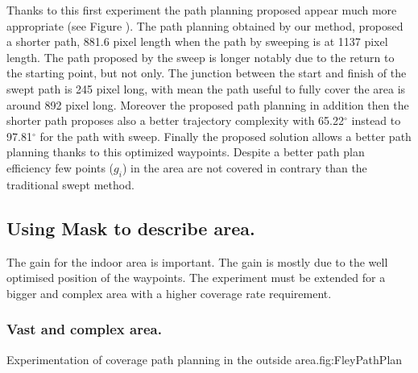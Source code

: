 Thanks to this first experiment the path planning proposed appear much more appropriate (see Figure ). The path planning obtained by our method, proposed a shorter path, 881.6 pixel length when  the path by sweeping is at 1137 pixel length. The path proposed by the sweep is longer notably due to the return to the starting point, but not only. The junction between the start and finish of the swept path is 245 pixel long, with mean the path useful to fully cover the area is around 892 pixel long. Moreover the proposed path planning in addition then the shorter path proposes also a better trajectory complexity  with 65.22$^\circ$ instead to 97.81$^\circ$ for the path with sweep.
Finally the proposed solution allows a better path planning thanks to this optimized waypoints. Despite a better path plan efficiency few points ($g_i$) in the area are not covered in contrary than the traditional swept method.



\subsection{Using Mask to describe area.}\label{coverageOutDoor}

The gain for the indoor area is important. The gain is mostly due to the well optimised position of the waypoints. The experiment must be extended for a bigger and complex area with a higher coverage rate requirement.


\subsubsection{Vast and complex area.} \label{fey_map_CPPP}
 
 \begin{mfigures}[!]{Experimentation of coverage path planning in the outside area.}{fig:FleyPathPlan} \centering
\hspace{1cm}

\tabsimuposeFleyPath
\end{mfigures} 
 
